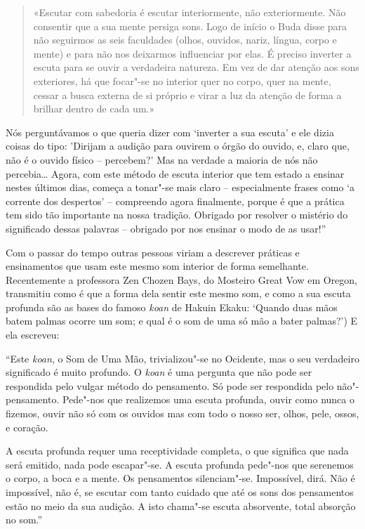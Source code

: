 \begin{quotation}
«Escutar com sabedoria é escutar interiormente, não exteriormente. Não consentir
que a sua mente persiga sons. Logo de início o Buda disse para não seguirmos as
seis faculdades (olhos, ouvidos, nariz, língua, corpo e mente) e para não nos
deixarmos influenciar por elas. É preciso inverter a escuta para se ouvir a
verdadeira natureza. Em vez de dar atenção aos sons exteriores, há que focar"-se
no interior quer no corpo, quer na mente, cessar a busca externa de si próprio e
virar a luz da atenção de forma a brilhar dentro de cada um.»\cite{surangama}
\end{quotation}

Nós perguntávamos o que queria dizer com `inverter a sua escuta' e ele
dizia coisas do tipo: 'Dirijam a audição para ouvirem o órgão do ouvido,
e, claro que, não é o ouvido físico -- percebem?' Mas na verdade a
maioria de nós não percebia\ldots{} Agora, com este método de escuta
interior que tem estado a ensinar nestes últimos dias, começa a tonar"-se
mais claro -- especialmente frases como `a corrente dos despertos' --
compreendo agora finalmente, porque é que a prática tem sido tão
importante na nossa tradição. Obrigado por resolver o mistério do
significado dessas palavras -- obrigado por nos ensinar o modo de as
usar!''

Com o passar do tempo outras pessoas viriam a descrever práticas e
ensinamentos que usam este mesmo som interior de forma semelhante.
Recentemente a professora Zen Chozen Bays, do Mosteiro Great Vow em
Oregon, transmitiu como é que a forma dela sentir este mesmo som, e como
a sua escuta profunda são as bases do famoso \emph{koan} de Hakuin
Ekaku: `Quando duas mãos batem palmas ocorre um som; e qual é o som de
uma só mão a bater palmas?') E ela escreveu:

``Este \emph{koan}, o Som de Uma Mão, trivializou"-se no Ocidente, mas o
seu verdadeiro significado é muito profundo. O \emph{koan} é uma
pergunta que não pode ser respondida pelo vulgar método do pensamento.
Só pode ser respondida pelo não"-pensamento. Pede"-nos que realizemos uma
escuta profunda, ouvir como nunca o fizemos, ouvir não só com os ouvidos
mas com todo o nosso ser, olhos, pele, ossos, e coração.

A escuta profunda requer uma receptividade completa, o que significa que
nada será emitido, nada pode escapar"-se. A escuta profunda pede"-nos que
serenemos o corpo, a boca e a mente. Os pensamentos silenciam"-se.
Impossível, dirá. Não é impossível, não é, se escutar com tanto cuidado
que até os sons dos pensamentos estão no meio da sua audição. A isto
chama"-se escuta absorvente, total absorção no som.''\cite{deep}

